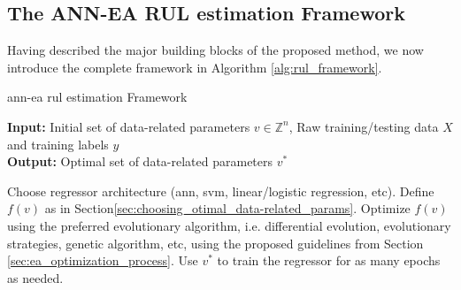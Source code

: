 \subsection{The ANN-EA RUL estimation Framework}

Having described the major building blocks of the proposed method, we now introduce the complete framework in Algorithm \ref{alg:rul_framework}.

\setcounter{algorithm}{0}
\begin{algorithm}[H]
\caption{\gls{ann}-\gls{ea} \gls{rul} estimation Framework}\label{alg:rul_framework}
\textbf{Input:} Initial set of data-related parameters $v \in \mathbb{Z}^n$, Raw training/testing data $X$ and training labels $y$\\
\textbf{Output:} Optimal set of data-related parameters $v^*$
	\begin{algorithmic}[1]
		\State Choose regressor architecture (\gls{ann}, \gls{svm}, linear/logistic regression, etc).
		\State Define $f(v)$ as in Section\ref{sec:choosing_otimal_data-related_params}.
		\State Optimize $f(v)$ using the preferred evolutionary algorithm, i.e. differential evolution, evolutionary strategies, genetic algorithm, etc, using the proposed guidelines from Section \ref{sec:ea_optimization_process}.
		\State Use $v^*$ to train the regressor for as many epochs as needed.
	\end{algorithmic}
\end{algorithm}